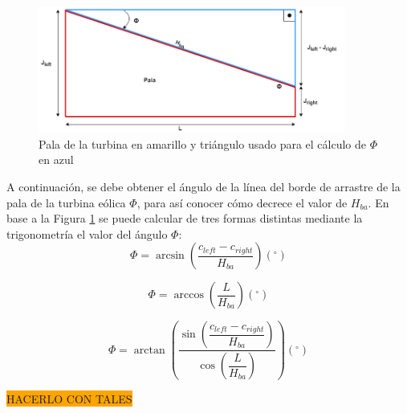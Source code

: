 \begin{figure}[H]
    \centering
    \includegraphics[width=0.9\textwidth]{images/triangulo sacar phi.png}
    \caption{Pala de la turbina en amarillo y triángulo usado para el cálculo de $\Phi$ en azul}
    
    \label{fig:pala_calculo_phi}
\end{figure}

A continuación, se debe obtener el ángulo de la línea del borde de arrastre de la pala de la turbina eólica $\Phi$, para así conocer cómo decrece el valor de $H_{ba}$.
En base a la Figura \ref{fig:pala_calculo_phi} se puede calcular de tres formas distintas mediante la trigonometría el valor del ángulo $\Phi$:
\begin{equation}
 \Phi = \arcsin{\left(\dfrac{c_{left} - c_{right}}{H_{ba}}\right)} (^{\circ})
\label{def_angulo_phi_1}
\end{equation}

\begin{equation}
 \Phi = \arccos{\left(\dfrac{L}{H_{ba}}\right)} (^{\circ})
\label{def_angulo_phi_2}
\end{equation}

\begin{equation}
 \Phi = \arctan{\left(\dfrac{\sin{\left(\dfrac{c_{left} - c_{right}}{H_{ba}}\right)}}{\cos{\left(\dfrac{L}{H_{ba}}\right)}}\right)} (^{\circ}) 
\label{def_angulo_phi_3}
\end{equation}

\colorbox{orange}{HACERLO CON TALES}


\\



